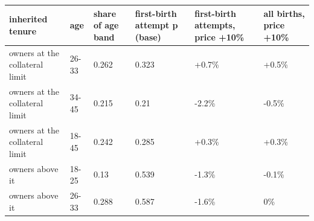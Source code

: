 \begingroup\small
\setlength{\tabcolsep}{3pt}
\renewcommand{\arraystretch}{1.04}
\begin{tabularx}{\linewidth}{XXXXXX}
\toprule
inherited tenure & age & share of age band & first-birth attempt p (base) & first-birth attempts, price +10\% & all births, price +10\% \\
\midrule
owners at the collateral limit & 26-33 & 0.262 & 0.323 & +0.7\% & +0.5\% \\
owners at the collateral limit & 34-45 & 0.215 & 0.21 & -2.2\% & -0.5\% \\
owners at the collateral limit & 18-45 & 0.242 & 0.285 & +0.3\% & +0.3\% \\
owners above it & 18-25 & 0.13 & 0.539 & -1.3\% & -0.1\% \\
owners above it & 26-33 & 0.288 & 0.587 & -1.6\% & 0\% \\
\bottomrule
\end{tabularx}
\endgroup
